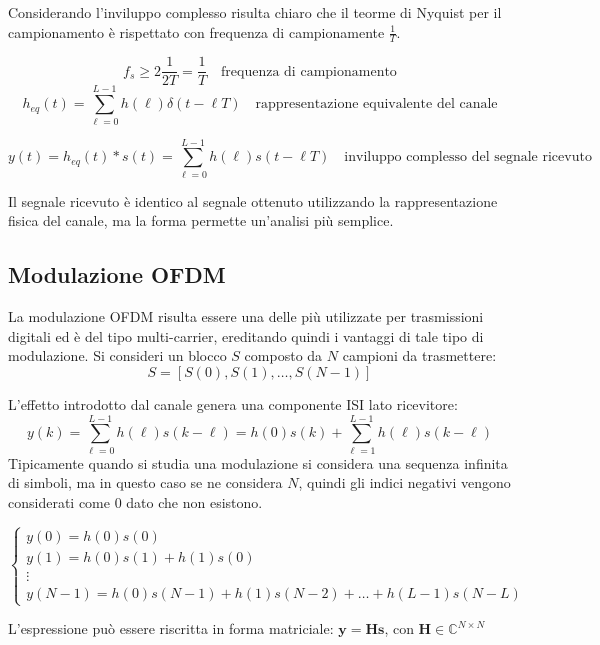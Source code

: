 Considerando l'inviluppo complesso risulta chiaro che il teorme di Nyquist per il campionamento è rispettato con frequenza di campionamente $\frac{1}{T}$.

\[
    f_s \geq 2 \frac{1}{2T} = \frac{1}{T} \quad \text{frequenza di campionamento} 
\]
\[
    h_{eq}(t) = \sum_{\ell=0}^{L-1} h(\ell) \delta(t - \ell T) \quad \text{rappresentazione equivalente del canale}
\]

\[
    y(t) = h_{eq}(t) \ast s(t) = \sum_{\ell=0}^{L-1} h(\ell) s(t - \ell T) \quad \text{inviluppo complesso del segnale ricevuto}
\]

Il segnale ricevuto è identico al segnale ottenuto utilizzando la rappresentazione fisica del canale, ma la forma permette un'analisi più semplice.


\subsection*{Modulazione OFDM}

La modulazione OFDM risulta essere una delle più utilizzate per trasmissioni digitali ed è del tipo multi-carrier, ereditando quindi i vantaggi di tale tipo di modulazione.
Si consideri un blocco $S$ composto da $N$ campioni da trasmettere:
\[
  S = \left[S(0), S(1), \ldots, S(N-1)\right]
\]

L'effetto introdotto dal canale genera una componente ISI lato ricevitore:
\[
  y(k) = \sum_{\ell=0}^{L-1} h(\ell) s(k - \ell) = h(0)s(k) + \sum_{\ell=1}^{L-1} h(\ell) s(k - \ell)
\]
Tipicamente quando si studia una modulazione si considera una sequenza infinita di simboli, ma in questo caso se ne considera $N$, quindi gli indici negativi vengono considerati come 0 dato che non esistono.

\[
  \begin{cases}
    y(0) = h(0)s(0) \\
    y(1) = h(0)s(1) + h(1)s(0) \\
    \vdots \\
    y(N-1) = h(0)s(N-1) + h(1)s(N-2) + \ldots + h(L-1)s(N-L)
  \end{cases}
\]

L'espressione può essere riscritta in forma matriciale: $\mathbf{y} = \mathbf{H} \mathbf{s}$, con $\mathbf{H} \in \mathbb{C}^{N \times N}$ 

